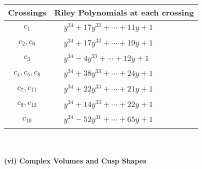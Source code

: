\documentclass[1p]{elsarticle_modified}
\theoremstyle{definition}
\begin{document}
\begin{tabular}{m{50pt}|m{274pt}}
Crossings & \hspace{64pt}Riley Polynomials at each crossing \\
\hline $$\begin{aligned}c_{1}\end{aligned}$$&$\begin{aligned}
&y^{34}+17 y^{33}+\cdots+11 y+1
\end{aligned}$\\
\hline $$\begin{aligned}c_{2},c_{6}\end{aligned}$$&$\begin{aligned}
&y^{34}+17 y^{33}+\cdots+19 y+1
\end{aligned}$\\
\hline $$\begin{aligned}c_{3}\end{aligned}$$&$\begin{aligned}
&y^{34}-4 y^{33}+\cdots+12 y+1
\end{aligned}$\\
\hline $$\begin{aligned}c_{4},c_{5},c_{8}\end{aligned}$$&$\begin{aligned}
&y^{34}+38 y^{33}+\cdots+24 y+1
\end{aligned}$\\
\hline $$\begin{aligned}c_{7},c_{11}\end{aligned}$$&$\begin{aligned}
&y^{34}+22 y^{33}+\cdots+21 y+1
\end{aligned}$\\
\hline $$\begin{aligned}c_{9},c_{12}\end{aligned}$$&$\begin{aligned}
&y^{34}+14 y^{33}+\cdots+22 y+1
\end{aligned}$\\
\hline $$\begin{aligned}c_{10}\end{aligned}$$&$\begin{aligned}
&y^{34}-52 y^{31}+\cdots+65 y+1
\end{aligned}$\\
\hline
\end{tabular}\\~\\
\newpage\flushleft \textbf{(vi) Complex Volumes and Cusp Shapes}
\end{document}
